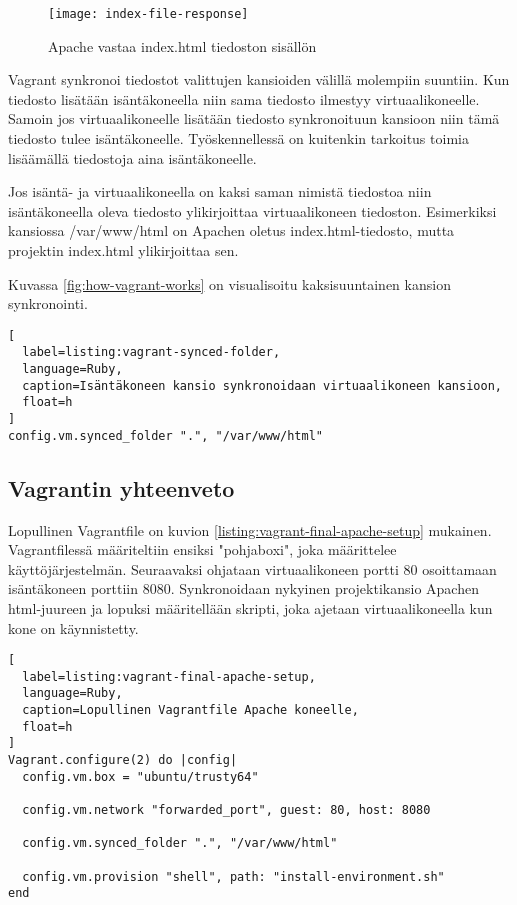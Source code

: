 \begin{figure}[h]
  \texttt{[image: index-file-response]}
  \caption{Apache vastaa index.html tiedoston sisällön}
  \label{fig:index-file-response}
\end{figure}

Vagrant synkronoi tiedostot valittujen kansioiden välillä molempiin suuntiin. Kun tiedosto lisätään isäntäkoneella niin sama tiedosto ilmestyy virtuaalikoneelle. Samoin jos virtuaalikoneelle lisätään tiedosto synkronoituun kansioon niin tämä tiedosto tulee isäntäkoneelle. Työskennellessä on kuitenkin tarkoitus toimia lisäämällä tiedostoja aina isäntäkoneelle.


Jos isäntä- ja virtuaalikoneella on kaksi saman nimistä tiedostoa niin isäntäkoneella oleva tiedosto ylikirjoittaa virtuaalikoneen tiedoston. Esimerkiksi kansiossa /var/www/html on Apachen oletus index.html-tiedosto, mutta projektin index.html ylikirjoittaa sen.

Kuvassa \ref{fig:how-vagrant-works} on visualisoitu kaksisuuntainen kansion synkronointi.

\begin{lstlisting}[
  label=listing:vagrant-synced-folder,
  language=Ruby,
  caption=Isäntäkoneen kansio synkronoidaan virtuaalikoneen kansioon,
  float=h
]
config.vm.synced_folder ".", "/var/www/html"
\end{lstlisting}

\subsection{Vagrantin yhteenveto}

Lopullinen Vagrantfile on kuvion \ref{listing:vagrant-final-apache-setup} mukainen. Vagrantfilessä määriteltiin ensiksi "pohjaboxi", joka määrittelee käyttöjärjestelmän. Seuraavaksi ohjataan virtuaalikoneen portti 80 osoittamaan isäntäkoneen porttiin 8080. Synkronoidaan nykyinen projektikansio Apachen html-juureen ja lopuksi määritellään skripti, joka ajetaan virtuaalikoneella kun kone on käynnistetty.

\begin{lstlisting}[
  label=listing:vagrant-final-apache-setup,
  language=Ruby,
  caption=Lopullinen Vagrantfile Apache koneelle,
  float=h
]
Vagrant.configure(2) do |config|
  config.vm.box = "ubuntu/trusty64"

  config.vm.network "forwarded_port", guest: 80, host: 8080

  config.vm.synced_folder ".", "/var/www/html"

  config.vm.provision "shell", path: "install-environment.sh"
end
\end{lstlisting}


